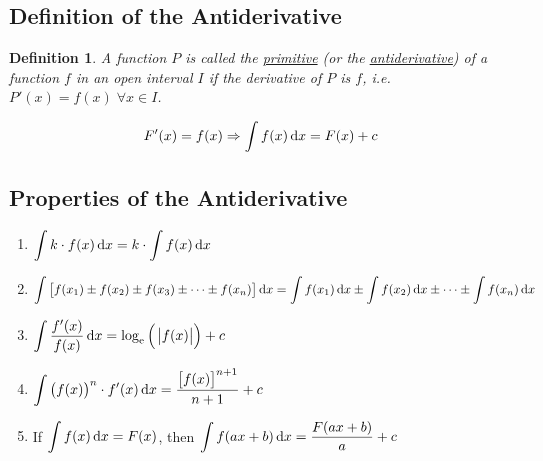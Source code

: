\documentclass[14]{article}
\newtheorem{define}{Definition}
\theoremstyle{definition}
\theoremstyle{case}
\begin{document}
\subsection{Definition of the Antiderivative}
\begin{define}
A function $P$ is called the \underline{primitive} (or the \underline{antiderivative}) of a function $f$ in an open interval $I$ if the derivative of $P$ is $f$, i.e. $P'(x) = f(x) \; \forall x \in I$.
\end{define}
\[ F'(x) = f(x) \Rightarrow \int f(x) \dif x = F(x) + c \]
\subsection{Properties of the Antiderivative}
\begin{enumerate}
\item $\displaystyle\int k \cdot f(x) \dif x = k \cdot \displaystyle\int f(x) \dif x$
\item $\displaystyle\int \left[ f(x_1) \pm f(x_2) \pm f(x_3) \pm \cdots \pm f(x_n) \right]\dif x = \displaystyle\int f(x_1) \dif x \pm \displaystyle\int f(x_2) \dif x \pm \cdots \pm \displaystyle\int f(x_n) \dif x$
\item $\displaystyle\int \dfrac{f'(x)}{f(x)}\dif x = \log_{\rm e}\left( \; \abs{f(x)} \right) + c$
\item $\displaystyle\int \left(f(x)\right)^n \cdot f'(x) \dif x = \dfrac{\left[f(x)\right]^{n+1}}{n+1}+c$
\item If $\displaystyle\int f(x) \dif x = F(x)$, then $\displaystyle\int f(ax+b) \dif x = \dfrac{F(ax+b)}{a}+c$
\end{enumerate}
\end{document}
